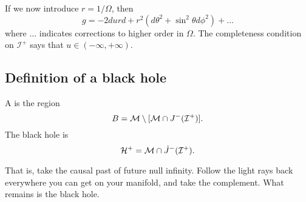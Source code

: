 If we now introduce $r=1/\Omega$, then
\begin{equation}
    g= -2du rd + r^2 (d\theta^2+\sin^2\theta d\phi^2)+\ldots
\end{equation}
where $\ldots$ indicates corrections to higher order in $\Omega$. The completeness condition on $\mathcal{I}^+$ says that $u\in (-\infty,+\infty)$.

\subsection*{Definition of a black hole}
\begin{defn}
    A  is the region
    \begin{equation}
        B=\mathcal{M} \setminus [\mathcal{M} \cap J^-(\mathcal{I}^+)].
    \end{equation}
    The black hole  is
    \begin{equation}
        \mathcal H^+ = \mathcal{M} \cap \dot J^{-}(\mathcal{I}^+).
    \end{equation}
\end{defn}
That is, take the causal past of future null infinity. Follow the light rays back everywhere you can get on your manifold, and take the complement. What remains is the black hole.